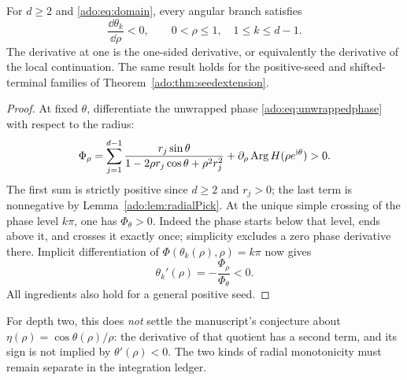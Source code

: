 \begin{theorem}
\label{ado:thm:radialmotion}
For $d\ge2$ and \eqref{ado:eq:domain}, every angular branch satisfies
\begin{equation}\label{ado:eq:strictmotion}
 \frac{\dd\theta_k}{\dd\rho}<0,
 \qquad 0<\rho\le1,\quad 1\le k\le d-1.
\end{equation}
The derivative at one is the one-sided derivative, or equivalently the
derivative of the local continuation. The same result holds for the
positive-seed and shifted-terminal families of
Theorem~\ref{ado:thm:seedextension}.
\end{theorem}
\begin{proof}
At fixed $\theta$, differentiate the unwrapped phase
\eqref{ado:eq:unwrappedphase} with respect to the radius:
\[
 \Phi_\rho
 =\sum_{j=1}^{d-1}
      \frac{r_j\sin\theta}{1-2\rho r_j\cos\theta+\rho^2r_j^2}
   +\partial_\rho\operatorname{Arg} H(\rho e^{\mathrm i\theta})>0.
\]
The first sum is strictly positive since $d\ge2$ and $r_j>0$; the
last term is nonnegative by Lemma~\ref{ado:lem:radialPick}.
At the unique simple crossing of the phase level $k\pi$, one has
$\Phi_\theta>0$. Indeed the phase starts below that level, ends
above it, and crosses it exactly once; simplicity excludes a zero
phase derivative there. Implicit differentiation of
$\Phi(\theta_k(\rho),\rho)=k\pi$ now gives
\[
 \theta_k'(\rho)=-\frac{\Phi_\rho}{\Phi_\theta}<0.
\]
All ingredients also hold for a general positive seed.
\end{proof}
For depth two, this does \emph{not} settle the manuscript's conjecture
about $\eta(\rho)=\cos\theta(\rho)/\rho$: the derivative of that
quotient has a second term, and its sign is not implied by
$\theta'(\rho)<0$. The two kinds of radial monotonicity must remain
separate in the integration ledger.
